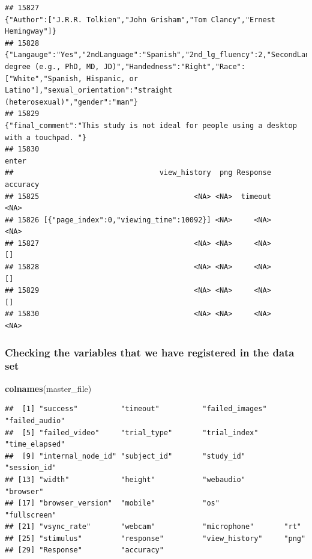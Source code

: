 \documentclass[
]{article}
\newenvironment{Shaded}{\begin{snugshade}}{\end{snugshade}}
\newcommand{\FunctionTok}[1]{\textcolor[rgb]{0.13,0.29,0.53}{\textbf{#1}}}
\newcommand{\NormalTok}[1]{#1}
\begin{document}
\begin{verbatim}
## 15827                                                                                                                                                                                                                                 {"Author":["J.R.R. Tolkien","John Grisham","Tom Clancy","Ernest Hemingway"]}
## 15828 {"Langauge":"Yes","2ndLanguage":"Spanish","2nd_lg_fluency":2,"SecondLanguage":"","3rd_lg_fluency":null,"age":"28","Highest_degree":"Doctoral degree (e.g., PhD, MD, JD)","Handedness":"Right","Race":["White","Spanish, Hispanic, or Latino"],"sexual_orientation":"straight (heterosexual)","gender":"man"}
## 15829                                                                                                                                                                                                                     {"final_comment":"This study is not ideal for people using a desktop with a touchpad. "}
## 15830                                                                                                                                                                                                                                                                                                        enter
##                                  view_history  png Response accuracy
## 15825                                    <NA> <NA>  timeout     <NA>
## 15826 [{"page_index":0,"viewing_time":10092}] <NA>     <NA>     <NA>
## 15827                                    <NA> <NA>     <NA>       []
## 15828                                    <NA> <NA>     <NA>       []
## 15829                                    <NA> <NA>     <NA>       []
## 15830                                    <NA> <NA>     <NA>     <NA>
\end{verbatim}

\hypertarget{checking-the-variables-that-we-have-registered-in-the-data-set}{%
\subsubsection{Checking the variables that we have registered in the
data
set}\label{checking-the-variables-that-we-have-registered-in-the-data-set}}

\begin{Shaded}
\begin{Highlighting}[]
\FunctionTok{colnames}\NormalTok{(master\_file)}
\end{Highlighting}
\end{Shaded}

\begin{verbatim}
##  [1] "success"          "timeout"          "failed_images"    "failed_audio"    
##  [5] "failed_video"     "trial_type"       "trial_index"      "time_elapsed"    
##  [9] "internal_node_id" "subject_id"       "study_id"         "session_id"      
## [13] "width"            "height"           "webaudio"         "browser"         
## [17] "browser_version"  "mobile"           "os"               "fullscreen"      
## [21] "vsync_rate"       "webcam"           "microphone"       "rt"              
## [25] "stimulus"         "response"         "view_history"     "png"             
## [29] "Response"         "accuracy"
\end{verbatim}
\end{document}
